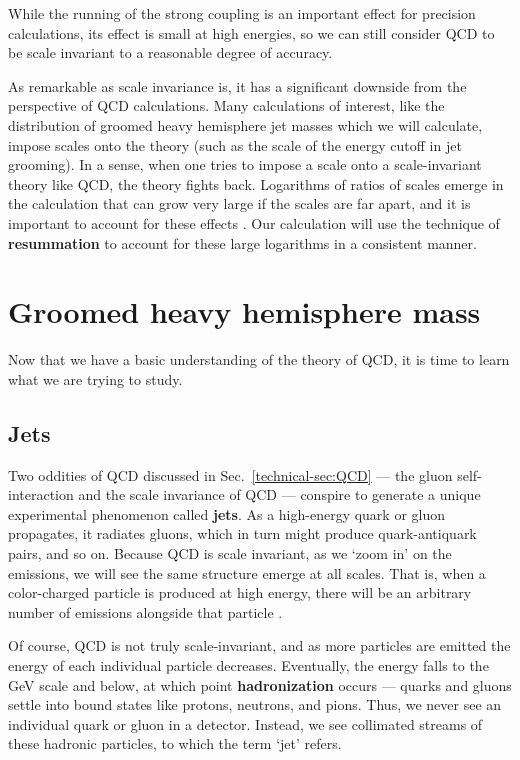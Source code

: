\documentclass[../thesis.tex]{subfiles}
\begin{document}
	While the running of the strong coupling is an important effect for precision calculations, its effect is small at high energies, so we can still consider QCD to be scale invariant to a reasonable degree of accuracy.

	As remarkable as scale invariance is, it has a significant downside from the perspective of QCD calculations. Many calculations of interest, like the distribution of groomed heavy hemisphere jet masses which we will calculate, impose scales onto the theory (such as the scale of the energy cutoff in jet grooming). In a sense, when one tries to impose a scale onto a scale-invariant theory like QCD, the theory fights back. Logarithms of ratios of scales emerge in the calculation that can grow very large if the scales are far apart, and it is important to account for these effects \cite{larkoski_elementary_2019-1,becher_introduction_2015-1}. Our calculation will use the technique of \textbf{resummation} to account for these large logarithms in a consistent manner.

\section{Groomed heavy hemisphere mass}
	Now that we have a basic understanding of the theory of QCD, it is time to learn what we are trying to study.

\subsection{Jets}\label{technical-sec:jets}
	Two oddities of QCD discussed in Sec.~\ref{technical-sec:QCD} --- the gluon self-interaction and the scale invariance of QCD --- conspire to generate a unique experimental phenomenon called \textbf{jets}. As a high-energy quark or gluon propagates, it radiates gluons, which in turn might produce quark-antiquark pairs, and so on. Because QCD is scale invariant, as we `zoom in' on the emissions, we will see the same structure emerge at all scales. That is, when a color-charged particle is produced at high energy, there will be an arbitrary number of emissions alongside that particle \cite{larkoski_elementary_2019-1}. 

	Of course, QCD is not truly scale-invariant, and as more particles are emitted the energy of each individual particle decreases. Eventually, the energy falls to the \si{\giga\electronvolt} scale and below, at which point \textbf{hadronization} occurs --- quarks and gluons settle into bound states like protons, neutrons, and pions. Thus, we never see an individual quark or gluon in a detector. Instead, we see collimated streams of these hadronic particles, to which the term `jet' refers.
\end{document}
